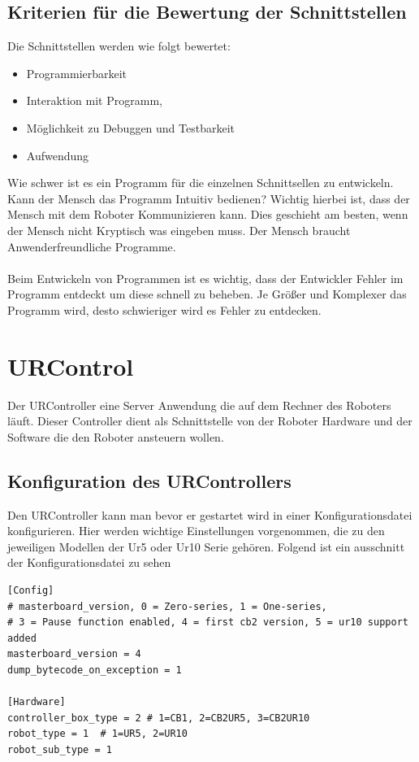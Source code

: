 \subsection{Kriterien für die Bewertung der Schnittstellen}
\label{sub:criterias_of_solutions_kon}

Die Schnittstellen werden wie folgt bewertet:

\begin{itemize}
\item Programmierbarkeit
\item Interaktion mit Programm,
\item Möglichkeit zu Debuggen und Testbarkeit
\item Aufwendung
\end{itemize}

Wie schwer ist es ein Programm für die einzelnen Schnittsellen zu entwickeln.
Kann der Mensch das Programm Intuitiv bedienen? Wichtig hierbei ist, dass der Mensch mit dem Roboter Kommunizieren kann. Dies geschieht am besten, wenn der Mensch nicht Kryptisch was eingeben muss. Der Mensch braucht Anwenderfreundliche Programme.
\\\\
Beim Entwickeln von Programmen ist es wichtig, dass der Entwickler Fehler im Programm entdeckt um diese schnell zu beheben.
Je Größer und Komplexer das Programm wird, desto schwieriger wird es Fehler zu entdecken.

\section{URControl}
\label{sec:ur_control_gru}

Der URController eine Server Anwendung die auf dem Rechner des Roboters läuft. 
Dieser Controller dient als Schnittstelle von der Roboter Hardware und der Software die den Roboter ansteuern wollen. 

\subsection{Konfiguration des URControllers}
\label{urcontrol_rci_gru}

Den URController kann man bevor er gestartet wird in einer Konfigurationsdatei konfigurieren.
Hier werden wichtige Einstellungen vorgenommen, die zu den jeweiligen Modellen der Ur5 oder Ur10 Serie gehören. Folgend ist ein ausschnitt der Konfigurationsdatei zu sehen
\\
\begin{lstlisting}[caption={Ausschnitt aus der Datei urcontrol.conf zur vorkonfigurierung des UR5 Roboters}, label=lst:ur5_conf ,captionpos=b]
[Config]
# masterboard_version, 0 = Zero-series, 1 = One-series, 
# 3 = Pause function enabled, 4 = first cb2 version, 5 = ur10 support added
masterboard_version = 4
dump_bytecode_on_exception = 1

[Hardware]
controller_box_type = 2 # 1=CB1, 2=CB2UR5, 3=CB2UR10
robot_type = 1  # 1=UR5, 2=UR10
robot_sub_type = 1
\end{lstlisting}

